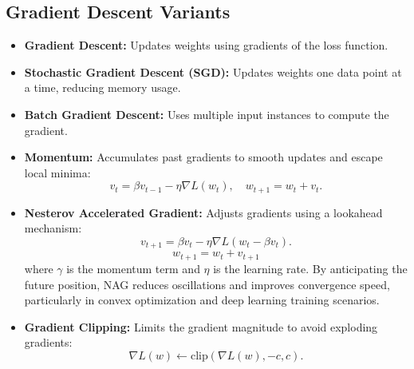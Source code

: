 \documentclass[12pt,a4paper]{article}
\begin{document}
\subsection{Gradient Descent Variants}
\begin{itemize}
    \item \textbf{Gradient Descent:} Updates weights using gradients of the loss function.
    \item \textbf{Stochastic Gradient Descent (SGD):} Updates weights one data point at a time, reducing memory usage.
    \item \textbf{Batch Gradient Descent:} Uses multiple input instances to compute the gradient.
    \item \textbf{Momentum:} Accumulates past gradients to smooth updates and escape local minima:
    \[ v_t = \beta v_{t-1} - \eta \nabla L(w_t), \quad w_{t+1} = w_t + v_t. \]
    \item \textbf{Nesterov Accelerated Gradient:} Adjusts gradients using a lookahead mechanism:
    \[ v_{t+1} = \beta v_{t} - \eta \nabla L(w_t - \beta v_t). \]
  \[
  w_{t+1} = w_t + v_{t+1}
  \]
  where \( \gamma \) is the momentum term and \( \eta \) is the learning rate. By anticipating the future position, NAG reduces oscillations and improves convergence speed, particularly in convex optimization and deep learning training scenarios.

    \item \textbf{Gradient Clipping:} Limits the gradient magnitude to avoid exploding gradients:
    \[ \nabla L(w) \leftarrow \text{clip}(\nabla L(w), -c, c). \]
\end{itemize}
\end{document}
